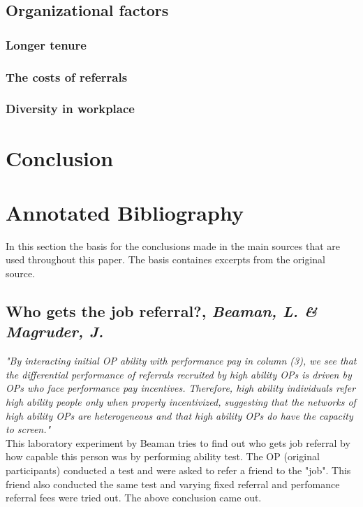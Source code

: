 \documentclass[a4paper, 11pt]{article} %
\begin{document}
\subsection*{Organizational factors}

\subsubsection*{Longer tenure}
\subsubsection*{The costs of referrals}
\subsubsection*{Diversity in workplace}



\section*{Conclusion}

\section*{Annotated Bibliography}
In this section the basis for the conclusions made in the main sources that are used throughout this paper. The basis containes excerpts from the original source.

\subsection*{Who gets the job referral?, \emph{Beaman, L. \& Magruder, J.} \cite{first}}

\emph{"By interacting initial OP ability with performance pay in column (3), we see that the differential
performance of referrals recruited by high ability OPs is driven by OPs who face performance
pay incentives. Therefore, high ability individuals refer high ability people only when properly
incentivized, suggesting that the networks of high ability OPs are heterogeneous and that high
ability OPs do have the capacity to screen."}\\

This laboratory experiment by Beaman tries to find out who gets job referral by how capable this person was by performing ability test. The OP (original participants) conducted a test and were asked to refer a friend to the "job". This friend also conducted the same test and varying fixed referral and perfomance referral fees were tried out. The above conclusion came out.
\end{document}
